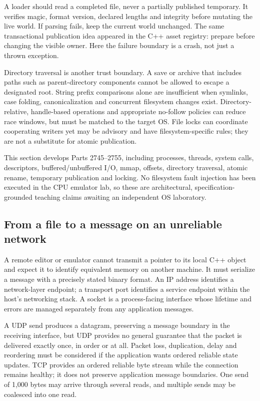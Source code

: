 A loader should read a completed file, never a partially published temporary. It verifies magic, format version, declared lengths and integrity before mutating the live world. If parsing fails, keep the current world unchanged. The same transactional publication idea appeared in the C++ asset registry: prepare before changing the visible owner. Here the failure boundary is a crash, not just a thrown exception.

Directory traversal is another trust boundary. A save or archive that includes paths such as parent-directory components cannot be allowed to escape a designated root. String prefix comparisons alone are insufficient when symlinks, case folding, canonicalization and concurrent filesystem changes exist. Directory-relative, handle-based operations and appropriate no-follow policies can reduce race windows, but must be matched to the target OS. File locks can coordinate cooperating writers yet may be advisory and have filesystem-specific rules; they are not a substitute for atomic publication.

This section develops Parts 2745--2755, including processes, threads, system calls, descriptors, buffered/unbuffered I/O, mmap, offsets, directory traversal, atomic rename, temporary publication and locking. No filesystem fault injection has been executed in the CPU emulator lab, so these are architectural, specification-grounded teaching claims awaiting an independent OS laboratory.

\subsection{From a file to a message on an unreliable network}\label{from-a-file-to-a-message-on-an-unreliable-network}

A remote editor or emulator cannot transmit a pointer to its local C++ object and expect it to identify equivalent memory on another machine. It must serialize a message with a precisely stated binary format. An IP address identifies a network-layer endpoint; a transport port identifies a service endpoint within the host's networking stack. A socket is a process-facing interface whose lifetime and errors are managed separately from any application messages.

A UDP send produces a datagram, preserving a message boundary in the receiving interface, but UDP provides no general guarantee that the packet is delivered exactly once, in order or at all. Packet loss, duplication, delay and reordering must be considered if the application wants ordered reliable state updates. TCP provides an ordered reliable byte stream while the connection remains healthy; it does not preserve application message boundaries. One send of 1,000 bytes may arrive through several reads, and multiple sends may be coalesced into one read.

